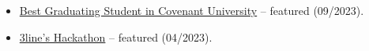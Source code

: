 \begin{itemize}
    \item \href{https://covenantuniversity.edu.ng/information/more/covenant-news/634-release-of-eagles-2023-283-students-bag-1st-class-degrees}{Best Graduating Student in Covenant University} -- featured (09/2023).
    \item \href{https://techcabal.com/2023/05/01/3lines-hackathon-targets-ai-integration-in-nigerias-financial-services/}{3line's Hackathon} -- featured (04/2023).
\end{itemize}
